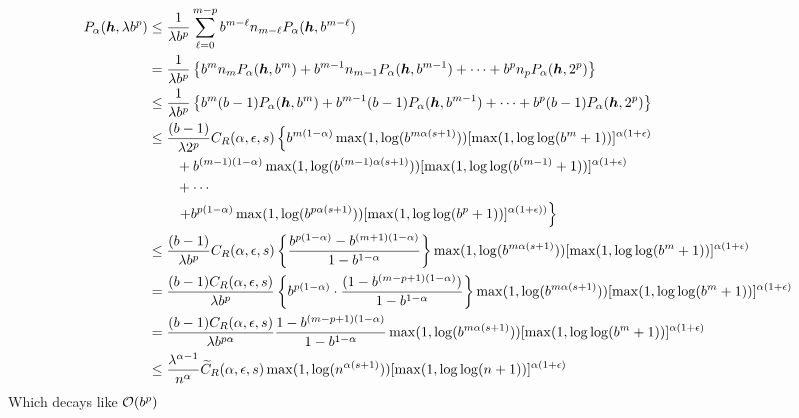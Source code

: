 \documentclass{amsart}
\begin{document}
\begin{align*}
    P_\alpha(\boldsymbol{h},\lambda b^p)
    & \le \frac {1}{\lambda b^p} \sum_{\ell = 0}^{m-p} b^{m-\ell} n_{m -\ell} P_\alpha(\boldsymbol{h},b^{m-\ell}) \\
    &= \frac {1}{\lambda b^p} \left\{b^m n_m P_\alpha(\boldsymbol{h},b^m) + b^{m-1} n_{m-1} P_\alpha(\boldsymbol{h},b^{m-1}) + \cdots + b^p n_p P_\alpha(\boldsymbol{h},2^p) 
    \right\} \\ 
    & \le \frac {1}{\lambda b^p} \left\{b^m (b-1) P_\alpha(\boldsymbol{h},b^m) + b^{m-1} (b-1) P_\alpha(\boldsymbol{h},b^{m-1}) + \cdots + b^p (b-1) P_\alpha(\boldsymbol{h},2^p) 
    \right\} \\ 
    & \le \frac {(b-1)}{\lambda 2^p} C_{R}(\alpha,\epsilon,s) \left\{ b^{m(1-\alpha)}\max(1, \log(b^{m\alpha(s+1)})) [\max(1,\log \log (
    b^m+1))]^{\alpha(1+\epsilon)}\right .\\ 
    & \qquad  + b^{(m-1)(1-\alpha)}\max(1, \log(b^{(m-1)\alpha(s+1)})) [\max(1,\log \log (
    b^{(m-1)}+1))]^{\alpha(1+\epsilon)}\\
      &  \qquad + \cdots \\
      & \qquad  \left . +   b^{p(1-\alpha)}\max(1,\log(b^{p\alpha(s+1)})) [\max(1,\log \log (b^p+1))]^{\alpha(1+\epsilon))}  \right\}\\
    & \le \frac {(b-1)}{\lambda b^p} C_{R}(\alpha,\epsilon,s) 
    \left\{\frac{b^{p(1-\alpha)} - b^{(m+1)(1- \alpha )}}{1 - b^{1 -\alpha}}\right\} \max(1, \log(b^{m\alpha(s+1)})) [\max(1,\log \log (
    b^m+1))]^{\alpha(1+\epsilon)} \\
    & = \frac { (b-1) C_{R}(\alpha,\epsilon,s)}{\lambda b^p} \left\{ b^{p(1-\alpha)} \cdot \frac{(1 - b^{(m-p+1)(1- \alpha )})}{1 - b^{1- \alpha}}\right\} 
     \max(1, \log(b^{m\alpha(s+1)})) [\max(1,\log \log (
    b^m+1))]^{\alpha(1+\epsilon)} \\
    &=  \frac {(b-1)C_{R}(\alpha,\epsilon,s)}{\lambda b^{p\alpha}}  \frac{1 - b^{(m-p+1)(1- \alpha )}}{1 - b^{1- \alpha}} \max(1, \log(b^{m\alpha(s+1)})) [\max(1,\log \log (
    b^m+1))]^{\alpha(1+\epsilon)} \\
    &\le \frac{\lambda^{\alpha -1}}{n^{\alpha}} \widetilde{C}_{R}(\alpha,\epsilon,s)  \max(1, \log(n^{\alpha(s+1)})) [\max(1,\log \log (
    n+1))]^{\alpha(1+\epsilon)} \\ 
\end{align*}
Which decays like $\operatorname{{\mathcal O}}(b^p)$ \\
\end{document}
